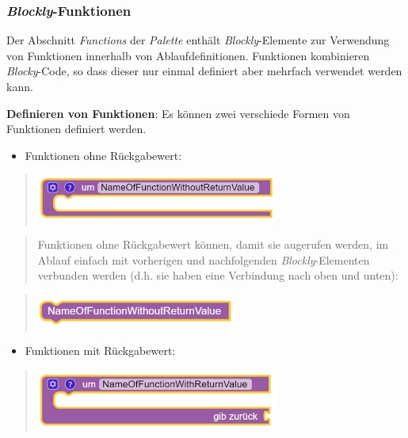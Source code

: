 \documentclass[
  letterpaper,
  DIV=11]{scrreprt}
\providecommand{\tightlist}{%
  \setlength{\itemsep}{0pt}\setlength{\parskip}{0pt}}\usepackage{longtable,booktabs,array}
\begin{document}
\begin{tcolorbox}
\hypertarget{blockly-funktionen-1}{%
\subsubsection{\texorpdfstring{\emph{Blockly}-Funktionen}{Blockly-Funktionen}}\label{blockly-funktionen-1}}

Der Abschnitt \emph{Functions} der \emph{Palette} enthält
\emph{Blockly}-Elemente zur Verwendung von Funktionen innerhalb von
Ablaufdefinitionen. Funktionen kombinieren \emph{Blocky}-Code, so dass
dieser nur einmal definiert aber mehrfach verwendet werden kann.

\textbf{Definieren von Funktionen}: Es können zwei verschiede Formen von
Funktionen definiert werden.

\begin{itemize}
\tightlist
\item
  Funktionen ohne Rückgabewert:
\end{itemize}

\begin{quote}
\includegraphics[width=3.125in,height=\textheight]{img/screenshot-blockly-function-without-return-value-01-DEU.png}
\end{quote}

\begin{quote}
Funktionen ohne Rückgabewert können, damit sie augerufen werden, im
Ablauf einfach mit vorherigen und nachfolgenden \emph{Blockly}-Elementen
verbunden werden (d.h. sie haben eine Verbindung nach oben und unten):
\end{quote}

\begin{quote}
\includegraphics[width=2.60417in,height=\textheight]{img/screenshot-blockly-function-call-without-return-value-01-DEU.png}
\end{quote}

\begin{itemize}
\tightlist
\item
  Funktionen mit Rückgabewert:
\end{itemize}

\begin{quote}
\includegraphics[width=3.125in,height=\textheight]{img/screenshot-blockly-function-with-return-value-01-DEU.png}
\end{quote}


\end{tcolorbox}
\end{document}
